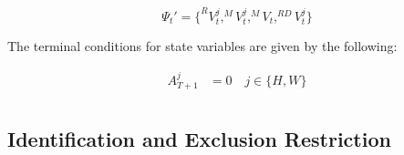 \begin{equation*}
\Psi_t'  =\{ ^{R}V_t^j, ^MV^j_t, ^{M}V_t, ^{RD}V_t^j\}
\end{equation*}

\noindent The terminal conditions for state variables are given by the following: 

\begin{align*}
A_{T+1}^j &= 0  \quad j \in \{H, W\} \\ 
\end{align*}

\subsection{Identification and Exclusion Restriction}





\clearpage



